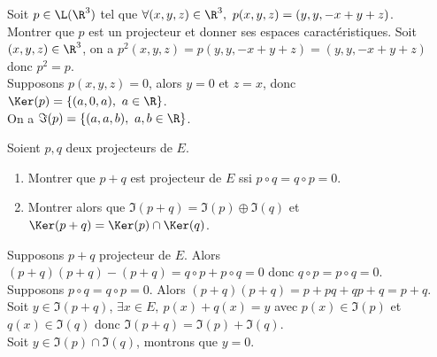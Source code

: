 \documentclass[11pt]{article}
\begin{document}
\vspace*{-0.7cm}

\begin{ex}{}{}
    Soit $p\in\L(\R^3)$ tel que $\forall (x,y,z)\in\R^3, ~ p(x,y,z)=(y,y,-x+y+z)$.\\
    Montrer que $p$ est un projecteur et donner ses espaces caractéristiques.
    \tcblower
    Soit $(x,y,z)\in\R^3$, on a $p^2(x,y,z)=p(y,y,-x+y+z)=(y,y,-x+y+z)$ donc $p^2=p$.\\
    Supposons $p(x,y,z)=0$, alors $y=0$ et $z=x$, donc $\Ker(p)=\{(a,0,a), ~ a\in\R\}$.\\
    On a $\Im(p)=\{(a,a,b), ~ a,b\in\R\}$.
\end{ex}

\vspace*{-0.7cm}

\begin{ex}{}{}
    Soient $p,q$ deux projecteurs de $E$.
    \begin{enumerate}
        \item Montrer que $p+q$ est projecteur de $E$ ssi $p\circ q=q\circ p=0$.
        \item Montrer alors que $\Im(p+q)=\Im(p)\oplus\Im(q)$ et $\Ker(p+q)=\Ker(p)\cap\Ker(q)$.
    \end{enumerate}
    \tcblower
     Supposons $p+q$ projecteur de $E$. Alors $(p+q)(p+q)-(p+q)=q\circ p+p\circ q=0$ donc $q\circ p=p\circ q=0$.\\
     Supposons $p\circ q=q\circ p=0$. Alors $(p+q)(p+q)=p+pq+qp+q=p+q$.\\
     Soit $y\in\Im(p+q)$, $\exists x \in E, ~ p(x)+q(x)=y$ avec $p(x)\in\Im(p)$ et $q(x)\in\Im(q)$ donc $\Im(p+q)=\Im(p)+\Im(q)$.\\
    Soit $y\in\Im(p)\cap\Im(q)$, montrons que $y=0$.  
\end{ex}
\end{document}
